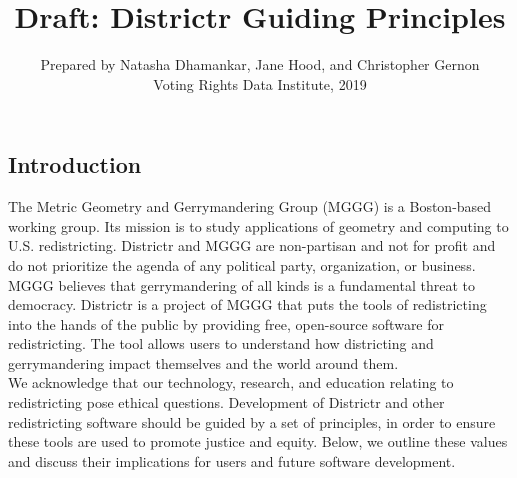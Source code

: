 \documentclass{mgggarticle}
\title{Draft: Districtr Guiding Principles}
\author{Prepared by Natasha Dhamankar, Jane Hood, and Christopher Gernon\\ Voting Rights Data Institute, 2019}
\begin{document}
\begin{titlepage}

\maketitle



\newpage

\subsection*{Introduction}

The Metric Geometry and Gerrymandering Group (MGGG) is a Boston-based working group. Its mission is to study applications of geometry and computing to U.S. redistricting. Districtr and MGGG are non-partisan and not for profit and do not prioritize the agenda of any political party, organization, or business.\\

\noindent MGGG believes that gerrymandering of all kinds is a fundamental threat to democracy. Districtr is a project of MGGG that puts the tools of redistricting into the hands of the public by providing free, open-source software for redistricting. The tool allows users to understand how districting and gerrymandering impact themselves and the world around them.\\ 

\noindent We acknowledge that our technology, research, and education relating to redistricting pose ethical questions. Development of Districtr and other redistricting software should be guided by a set of principles, in order to ensure these tools are used to promote justice and equity. Below, we outline these values and discuss their implications for users and future software development.\\



\end{titlepage}


\end{document}
